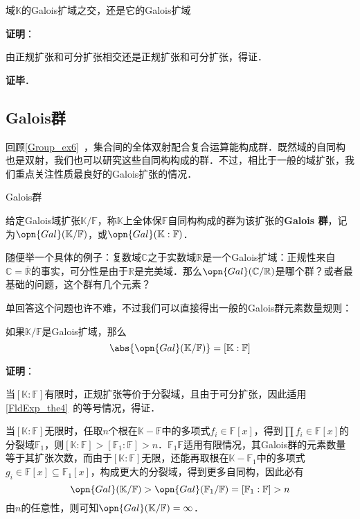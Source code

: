 \begin{theorem}{}
域$\mathbb{K}$的Galois扩域之交，还是它的Galois扩域
\end{theorem}

\textbf{证明}：

由正规扩张和可分扩张相交还是正规扩张和可分扩张，得证．

\textbf{证毕}．



\subsection{Galois群}

回顾\autoref{Group_ex6}~，集合间的全体双射配合复合运算能构成群．既然域的自同构也是双射，我们也可以研究这些自同构构成的群．不过，相比于一般的域扩张，我们重点关注性质最良好的Galois扩张的情况．

\begin{definition}{Galois群}

给定Galois域扩张$\mathbb{K}/\mathbb{F}$，称$\mathbb{K}$上全体保$\mathbb{F}$自同构构成的群为该扩张的\textbf{Galois 群}，记为$\opn{Gal}(\mathbb{K}/\mathbb{F})$，或$\opn{Gal}(\mathbb{K}:\mathbb{F})$．

\end{definition}


随便举一个具体的例子：复数域$\mathbb{C}$之于实数域$\mathbb{R}$是一个Galois扩域：正规性来自$\mathbb{C}=\overline{\mathbb{R}}$的事实，可分性是由于$\mathbb{R}$是完美域．那么$\opn{Gal}(\mathbb{C}/\mathbb{R})$是哪个群？或者最基础的问题，这个群有几个元素？

单回答这个问题也许不难，不过我们可以直接得出一般的Galois群元素数量规则：

\begin{theorem}{}\label{GExt_the2}
如果$\mathbb{K}/\mathbb{F}$是Galois扩域，那么
\begin{equation}
\abs{\opn{Gal}(\mathbb{K}/\mathbb{F})} = [\mathbb{K}:\mathbb{F}]
\end{equation}
\end{theorem}

\textbf{证明}：

当$[\mathbb{K}:\mathbb{F}]$有限时，正规扩张等价于分裂域，且由于可分扩张，因此适用\autoref{FldExp_the4}~的等号情况，得证．

当$[\mathbb{K}:\mathbb{F}]$无限时，任取$n$个根在$\mathbb{K}-\mathbb{F}$中的多项式$f_i\in\mathbb{F}[x]$，得到$\prod f_i\in\mathbb{F}[x]$的分裂域$\mathbb{F}_1$，则$[\mathbb{K}:\mathbb{F}]>[\mathbb{F}_1:\mathbb{F}]>n$．$\mathbb{F}_1\mathbb{F}$适用有限情况，其Galois群的元素数量等于其扩张次数，而由于$[\mathbb{K}:\mathbb{F}]$无限，还能再取根在$\mathbb{K}-\mathbb{F}_1$中的多项式$g_i\in\mathbb{F}[x]\subseteq \mathbb{F}_1[x]$，构成更大的分裂域，得到更多自同构，因此必有
\begin{equation}
\opn{Gal}(\mathbb{K}/\mathbb{F})>\opn{Gal}(\mathbb{F}_1/\mathbb{F})=[\mathbb{F}_1:\mathbb{F}]>n
\end{equation}
由$n$的任意性，则可知$\opn{Gal}(\mathbb{K}/\mathbb{F})=\infty$．

